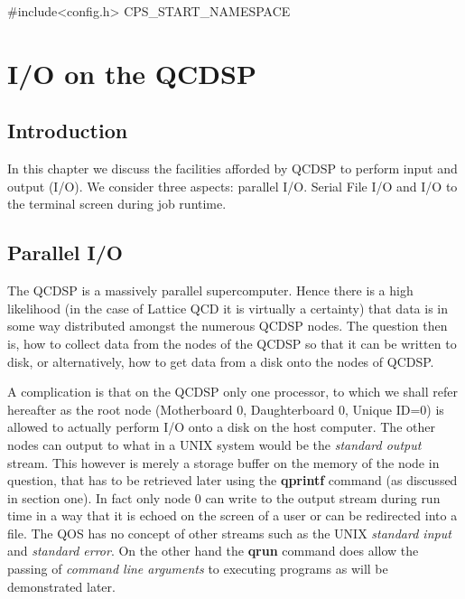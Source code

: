 #include<config.h>
CPS_START_NAMESPACE
\chapter{I/O on the QCDSP}
\section{Introduction}
In this chapter we discuss the facilities afforded by QCDSP to perform
input and output (I/O). We consider three aspects: parallel I/O. 
Serial File I/O and I/O to the terminal screen during job runtime.

\section{Parallel I/O}
The QCDSP is a massively parallel supercomputer. Hence there is a high
likelihood (in the case of Lattice QCD it is virtually a certainty) that data
is in some way distributed amongst the numerous QCDSP nodes. The question
then is, how to collect data from the nodes of the QCDSP so that it 
can be written to disk, or alternatively, how to get data from a disk
onto the nodes of QCDSP.

A complication is that on the QCDSP only one processor, to which we
shall refer hereafter as the root node (Motherboard 0, Daughterboard 0,
Unique ID=0) is allowed to actually perform I/O onto a disk on the
host computer. The other nodes can output to what in a UNIX system
would be the {\em standard output} stream. This however is merely a
storage buffer on the memory of the node in question, that has to be
retrieved later using the {\bf qprintf} command (as discussed in
section one).  In fact only node 0 can write to the output stream
during run time in a way that it is echoed on the screen of a user or
can be redirected into a file.  The QOS has no concept of other
streams such as the UNIX {\em standard input} and {\em standard
error}. On the other hand the {\bf qrun} command does allow the
passing of {\em command line arguments} to executing programs as will
be demonstrated later.

